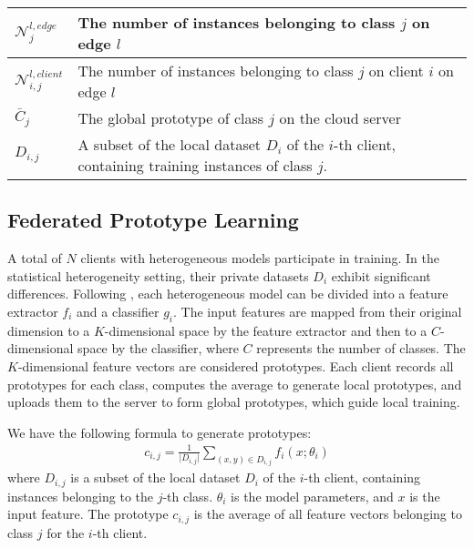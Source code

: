 \documentclass[journal]{IEEEtran}
\begin{document}
\begin{table}[H]
\begin{tabular}{|@{}m{1cm}<{\centering}|m{6.5cm}|}
    \hline
    \(\mathcal{N}_{j}^{l,edge}\) & The number of instances belonging to class \( j \) on edge \( l \) \\ 
    \hline
    \(\mathcal{N}_{i,j}^{l,client}\) & The number of instances belonging to class \( j \) on client $i$ on edge \( l \) \\ 
    \hline
    \( \bar{C}_j \)                       & The global prototype of class $j$ on the cloud server                                                                            \\
    \hline
    \( D_{i,j} \)                         & A subset of the local dataset \(D_i\) of the $i$-th client, containing training instances of class $j$.                               \\
    \hline
  \end{tabular}
\end{table}
\subsection{Federated Prototype Learning}
A total of \( N \) clients with heterogeneous models participate in training. In the statistical heterogeneity setting, their private datasets \( D_i \) exhibit significant differences. Following \cite{tan_fedproto_2021}\cite{zhang_fedtgp_2024}, each heterogeneous model can be divided into a feature extractor \( f_i \) and a classifier \( g_i \). The input features are mapped from their original dimension to a \( K \)-dimensional space by the feature extractor and then to a \( C \)-dimensional space by the classifier, where \( C \) represents the number of classes. The \( K \)-dimensional feature vectors are considered prototypes. Each client records all prototypes for each class, computes the average to generate local prototypes, and uploads them to the server to form global prototypes, which guide local training.

We have the following formula to generate prototypes:
\begin{align}
\label{client prototype formula}
c_{i,j} = \frac{1}{\rvert D_{i,j} \rvert} \sum_{(x,y)\in D_{i,j}}{f_i(x;\theta_i)}
\end{align}
where $D_{i,j}$ is a subset of the local dataset $D_i$ of the $i$-th client, containing instances belonging to the $j$-th class. $\theta_i$ is the model parameters, and $x$ is the input feature. The prototype $c_{i,j}$ is the average of all feature vectors belonging to class $j$ for the $i$-th client.
\end{document}
